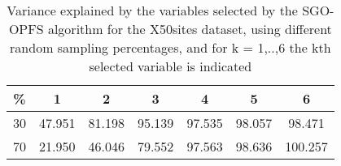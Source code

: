 \begin{table}
	\begin{center}
		\begin{tabular}{c c c c c c c}
			\% & 1 & 2 & 3 & 4 & 5 & 6 \\
			\hline
			30 & 47.951 & 81.198 & 95.139 & 97.535 & 98.057 & 98.471 \\
			70 & 21.950 & 46.046 & 79.552 & 97.563 & 98.636 & 100.257 \\
		\end{tabular}
	\end{center}
	\caption{Variance explained by the variables selected by the SGO-OPFS algorithm for the X50sites dataset, using different random sampling percentages, and for k = 1,..,6 the kth selected variable is indicated}
\end{table}